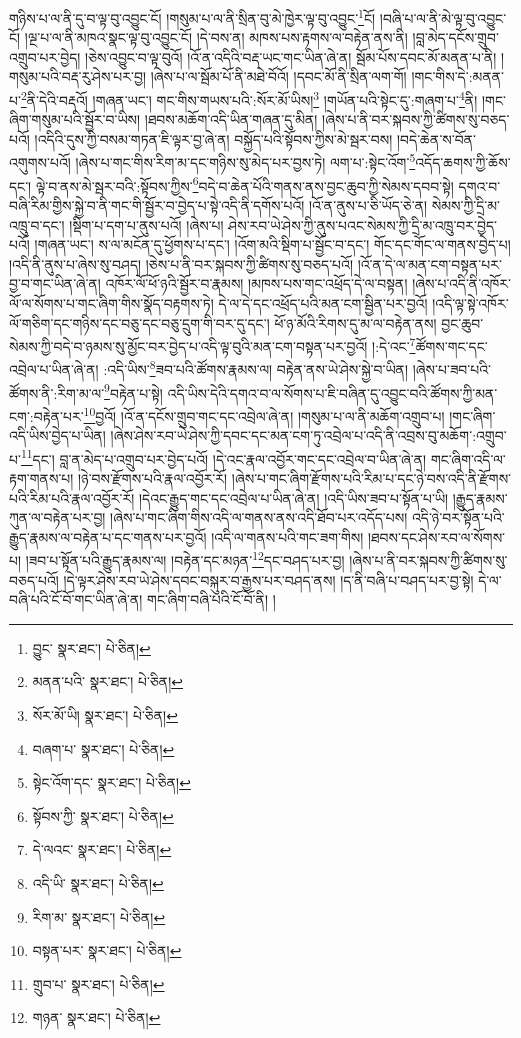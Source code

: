 གཉིས་པ་ལ་ནི་དུ་བ་ལྟ་བུ་འབྱུང་ངོ། །གསུམ་པ་ལ་ནི་སྲིན་བུ་མེ་ཁྱེར་ལྟ་བུ་འབྱུང་\footnote{བྱུང་  སྣར་ཐང་།  པེ་ཅིན། }ངོ། །བཞི་པ་ལ་ནི་མེ་ལྟ་བུ་འབྱུང་ངོ། །ལྔ་པ་ལ་ནི་མཁའ་སྣང་ལྟ་བུ་འབྱུང་ངོ། །དེ་བས་ན། མཁས་པས་རྟགས་ལ་བརྟེན་ནས་ནི། །བླ་མེད་དངོས་གྲུབ་འགྲུབ་པར་བྱེད། །ཅེས་འབྱུང་བ་ལྟ་བུའོ། །འོ་ན་འདིའི་བརྡ་ཡང་གང་ཡིན་ཞེ་ན། སྦོམ་པོས་དབང་མོ་མནན་པ་ནི། །གསུམ་པའི་བརྡ་རུ་ཤེས་པར་བྱ། །ཞེས་པ་ལ་སྦོམ་པོ་ནི་མཐེ་བོའོ། །དབང་མོ་ནི་སྲིན་ལག་གོ། །གང་གིས་དེ་:མནན་པ་\footnote{མནན་པའི་  སྣར་ཐང་།  པེ་ཅིན། }ནི་དེའི་བརྡའོ། །གཞན་ཡང་། གང་གིས་གཡས་པའི་:སོར་མོ་ཡིས།\footnote{སོར་མོ་ཡི།  སྣར་ཐང་།  པེ་ཅིན། } །གཡོན་པའི་སྟེང་དུ་:གཞག་པ་\footnote{བཞག་པ་  སྣར་ཐང་།  པེ་ཅིན། }ནི། །གང་ཞིག་གསུམ་པའི་སྦྱོར་བ་ཡིས། །ཐབས་མཆོག་འདི་ཡིན་གཞན་དུ་མིན། །ཞེས་པ་ནི་བར་སྐབས་ཀྱི་ཚིགས་སུ་བཅད་པའོ། །འདིའི་དུས་ཀྱི་བསམ་གཏན་ཇི་ལྟར་བྱ་ཞེ་ན། བསྐྱོད་པའི་སྟོབས་ཀྱིས་མེ་སྦར་བས། །བདེ་ཆེན་ས་བོན་འགུགས་པའོ། །ཞེས་པ་གང་གིས་རིག་མ་དང་གཉིས་སུ་མེད་པར་བྱས་ཏེ། ལག་པ་:སྟེང་འོག་\footnote{སྟེང་འོག་དང་  སྣར་ཐང་།  པེ་ཅིན། }འདོད་ཆགས་ཀྱི་ཆོས་དང་། ལྟེ་བ་ནས་མེ་སྦར་བའི་:སྟོབས་ཀྱིས་\footnote{སྟོབས་ཀྱི་  སྣར་ཐང་།  པེ་ཅིན། }བདེ་བ་ཆེན་པོའི་གནས་ནས་བྱང་ཆུབ་ཀྱི་སེམས་དབབ་སྟེ། དགའ་བ་བཞི་རིམ་གྱིས་སྐྱེ་བ་ནི་གང་གི་སྦྱོར་བ་བྱེད་པ་སྟེ་འདི་ནི་དགོས་པའོ། །འོ་ན་ནུས་པ་ཅི་ཡོད་ཅེ་ན། སེམས་ཀྱི་དྲི་མ་འཁྲུ་བ་དང་། །སྡིག་པ་དག་པ་ནུས་པའོ། །ཞེས་པ། ཤེས་རབ་ཡེ་ཤེས་ཀྱི་ནུས་པའང་སེམས་ཀྱི་དྲི་མ་འཁྲུ་བར་བྱེད་པའོ། །གཞན་ཡང་། ས་ལ་མངོན་དུ་ཕྱོགས་པ་དང་། །འོག་མའི་སྡིག་པ་སྦྱོང་བ་དང་། གོང་དང་གོང་ལ་གནས་བྱེད་པ། །འདི་ནི་ནུས་པ་ཞེས་སུ་བཤད། །ཅེས་པ་ནི་བར་སྐབས་ཀྱི་ཚིགས་སུ་བཅད་པའོ། །འོ་ན་དེ་ལ་མན་ངག་བསྟན་པར་བྱ་བ་གང་ཡིན་ཞེ་ན། འཁོར་ལོ་ཕོ་ཉའི་སྦྱོར་བ་རྣམས། །མཁས་པས་གང་འཕྲོད་དེ་ལ་བསྟན། །ཞེས་པ་འདི་ནི་འཁོར་ལོ་ལ་སོགས་པ་གང་ཞིག་གིས་སྣོད་བརྟགས་ཏེ། དེ་ལ་དེ་དང་འཕྲོད་པའི་མན་ངག་སྦྱིན་པར་བྱའོ། །འདི་ལྟ་སྟེ་འཁོར་ལོ་གཅིག་དང་གཉིས་དང་བཅུ་དང་བཅུ་དྲུག་གི་བར་དུ་དང་། ཕོ་ཉ་མོའི་རིགས་དུ་མ་ལ་བརྟེན་ནས། བྱང་ཆུབ་སེམས་ཀྱི་བདེ་བ་ཉམས་སུ་མྱོང་བར་བྱེད་པ་འདི་ལྟ་བུའི་མན་ངག་བསྟན་པར་བྱའོ། །:དེ་འང་\footnote{དེ་ལའང་  སྣར་ཐང་།  པེ་ཅིན། }ཚོགས་གང་དང་འབྲེལ་པ་ཡིན་ཞེ་ན། :འདི་ཡིས་\footnote{འདི་ཡི་  སྣར་ཐང་།  པེ་ཅིན། }ཟབ་པའི་ཚོགས་རྣམས་ལ། བརྟེན་ནས་ཡེ་ཤེས་སྐྱེ་བ་ཡིན། །ཞེས་པ་ཟབ་པའི་ཚོགས་ནི་:རིག་མ་ལ་\footnote{རིག་མ་  སྣར་ཐང་།  པེ་ཅིན། }བརྟེན་པ་སྟེ། འདི་ཡིས་དེའི་དགའ་བ་ལ་སོགས་པ་ཇི་བཞིན་དུ་འབྱུང་བའི་ཚོགས་ཀྱི་མན་ངག་:བརྟེན་པར་\footnote{བསྟན་པར་  སྣར་ཐང་།  པེ་ཅིན། }བྱའོ། །འོ་ན་དངོས་གྲུབ་གང་དང་འབྲེལ་ཞེ་ན། །གསུམ་པ་ལ་ནི་མཆོག་འགྲུབ་པ། །གང་ཞིག་འདི་ཡིས་བྱེད་པ་ཡིན། །ཞེས་ཤེས་རབ་ཡེ་ཤེས་ཀྱི་དབང་དང་མན་ངག་ཏུ་འབྲེལ་པ་འདི་ནི་འབྲས་བུ་མཆོག་:འགྲུབ་པ་\footnote{གྲུབ་པ་  སྣར་ཐང་།  པེ་ཅིན། }དང་། བླ་ན་མེད་པ་འགྲུབ་པར་བྱེད་པའོ། །དེ་འང་རྣལ་འབྱོར་གང་དང་འབྲེལ་བ་ཡིན་ཞེ་ན། གང་ཞིག་འདི་ལ་རྟག་གནས་པ། །ཉེ་བས་རྫོགས་པའི་རྣལ་འབྱོར་རོ། །ཞེས་པ་གང་ཞིག་རྫོགས་པའི་རིམ་པ་དང་ཉེ་བས་འདི་ནི་རྫོགས་པའི་རིམ་པའི་རྣལ་འབྱོར་རོ། །དེའང་རྒྱུད་གང་དང་འབྲེལ་པ་ཡིན་ཞེ་ན། །འདི་ཡིས་ཟབ་པ་སྟོན་པ་ཡི། །རྒྱུད་རྣམས་ཀུན་ལ་བརྟེན་པར་བྱ། །ཞེས་པ་གང་ཞིག་གིས་འདི་ལ་གནས་ནས་འདི་ཐོབ་པར་འདོད་པས། འདི་ཉེ་བར་སྟོན་པའི་རྒྱུད་རྣམས་ལ་བརྟེན་པ་དང་གནས་པར་བྱའོ། །འདི་ལ་གནས་པའི་གང་ཟག་གིས། །ཐབས་དང་ཤེས་རབ་ལ་སོགས་པ། །ཟབ་པ་སྟོན་པའི་རྒྱུད་རྣམས་ལ། །བརྟེན་དང་མཉན་\footnote{གཉན་  སྣར་ཐང་།  པེ་ཅིན། }དང་བཤད་པར་བྱ། །ཞེས་པ་ནི་བར་སྐབས་ཀྱི་ཚིགས་སུ་བཅད་པའོ། །དེ་ལྟར་ཤེས་རབ་ཡེ་ཤེས་དབང་བསྐུར་བ་རྒྱས་པར་བཤད་ནས། །ད་ནི་བཞི་པ་བཤད་པར་བྱ་སྟེ། དེ་ལ་བཞི་པའི་ངོ་བོ་གང་ཡིན་ཞེ་ན། གང་ཞིག་བཞི་པའི་ངོ་བོ་ནི། །

